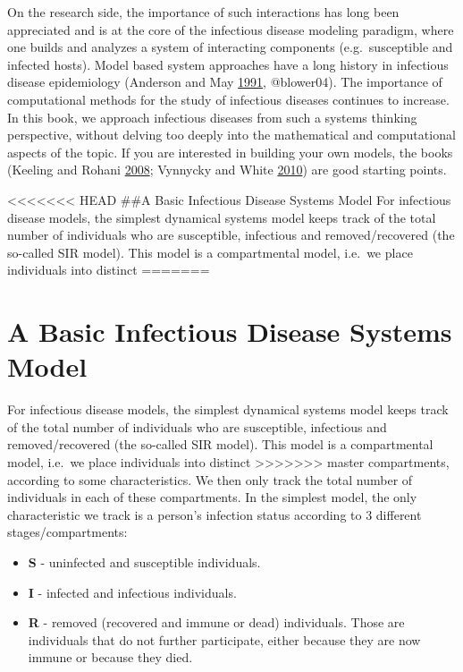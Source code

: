 \documentclass[]{book}
\providecommand{\tightlist}{%
  \setlength{\itemsep}{0pt}\setlength{\parskip}{0pt}}
\theoremstyle{definition}
\theoremstyle{definition}
\theoremstyle{definition}
\theoremstyle{remark}
\begin{document}
On the research side, the importance of such interactions has long been
appreciated and is at the core of the infectious disease modeling
paradigm, where one builds and analyzes a system of interacting
components (e.g.~susceptible and infected hosts). Model based system
approaches have a long history in infectious disease epidemiology
(Anderson and May \protect\hyperlink{ref-anderson91}{1991}, @blower04).
The importance of computational methods for the study of infectious
diseases continues to increase. In this book, we approach infectious
diseases from such a systems thinking perspective, without delving too
deeply into the mathematical and computational aspects of the topic. If
you are interested in building your own models, the books (Keeling and
Rohani \protect\hyperlink{ref-keeling08}{2008}; Vynnycky and White
\protect\hyperlink{ref-vynnycky10}{2010}) are good starting points.

<<<<<<< HEAD
\#\#A Basic Infectious Disease Systems Model For infectious disease
models, the simplest dynamical systems model keeps track of the total
number of individuals who are susceptible, infectious and
removed/recovered (the so-called SIR model). This model is a
compartmental model, i.e.~we place individuals into distinct
=======
\section{A Basic Infectious Disease Systems
Model}\label{a-basic-infectious-disease-systems-model}

For infectious disease models, the simplest dynamical systems model
keeps track of the total number of individuals who are susceptible,
infectious and removed/recovered (the so-called SIR model). This model
is a compartmental model, i.e.~we place individuals into distinct
>>>>>>> master
compartments, according to some characteristics. We then only track the
total number of individuals in each of these compartments. In the
simplest model, the only characteristic we track is a person's infection
status according to 3 different stages/compartments:

\begin{itemize}
\tightlist
\item
  \textbf{S} - uninfected and susceptible individuals.
\item
  \textbf{I} - infected and infectious individuals.
\item
  \textbf{R} - removed (recovered and immune or dead) individuals. Those
  are individuals that do not further participate, either because they
  are now immune or because they died.
\end{itemize}
\end{document}
